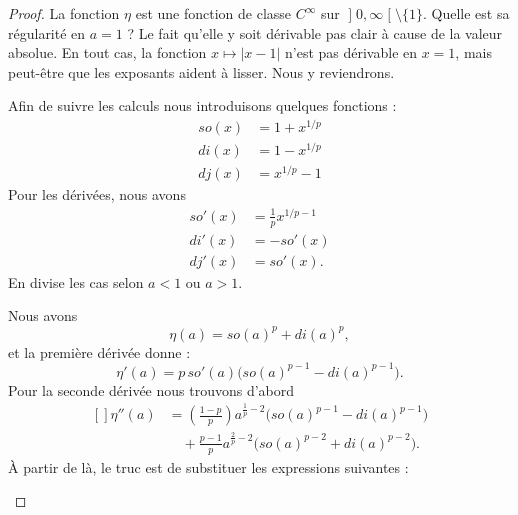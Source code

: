 	\begin{proof}
		La fonction \( \eta\) est une fonction de classe \(  C^{\infty}\) sur \( \mathopen] 0 , \infty \mathclose[\setminus\{ 1 \}\). Quelle est sa régularité en \( a=1\) ? Le fait qu'elle y soit dérivable pas clair à cause de la valeur absolue. En tout cas, la fonction \( x\mapsto| x-1 |\) n'est pas dérivable en \( x=1\), mais peut-être que les exposants aident à lisser. Nous y reviendrons.

			Afin de  suivre les calculs nous introduisons quelques fonctions :
			\begin{subequations}
				\begin{align}
					so(x) & =1+x^{1/p} \\
					di(x) & =1-x^{1/p} \\
					dj(x) & =x^{1/p}-1
				\end{align}
			\end{subequations}
			Pour les dérivées, nous avons
			\begin{subequations}
				\begin{align}
					so'(x) & =\frac{1}{ p }x^{1/p-1} \\
					di'(x) & =-so'(x)                \\
					dj'(x) & =so'(x).
				\end{align}
			\end{subequations}
			En divise les cas selon \( a<1\) ou \( a>1\).
			\begin{subproof}
				\spitem[Pour \( a<1\)]
				Nous avons
				\begin{equation}
					\eta(a)=so(a)^p+di(a)^p,
				\end{equation}
				et la première dérivée donne :
				\begin{equation}        \label{EQooCLXZooXClOwd}
					\eta'(a)=p\,so'(a)\big( so(a)^{p-1}-di(a)^{p-1} \big).
				\end{equation}
				Pour la seconde dérivée nous trouvons d'abord
				\begin{equation}
					\begin{aligned}[]
						\eta''(a) & =\left( \frac{ 1-p }{ p } \right)a^{\frac{ 1 }{ p }-2}\big( so(a)^{p-1}-di(a)^{p-1} \big) \\
						          & \quad+\frac{ p-1 }{ p }a^{\frac{ 2 }{ p }-2}\big( so(a)^{p-2}+di(a)^{p-2} \big).
					\end{aligned}
				\end{equation}
				À partir de là, le truc est de substituer les expressions suivantes :
				\begin{subequations}

\end{subequations}
\end{subproof}
\end{proof}
